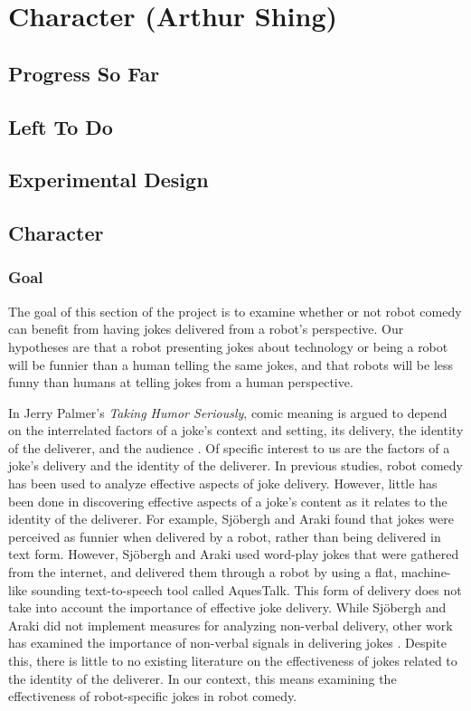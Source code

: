 \documentclass[onecolumn, draftclsnofoot,10pt, compsoc]{IEEEtran}
\begin{document}
\section{Character (Arthur Shing)}
\subsection{Progress So Far}
\subsection{Left To Do}
\subsection{Experimental Design}
\subsection{Character}
\subsubsection{Goal}
The goal of this section of the project is to examine whether or not robot comedy can benefit from having jokes delivered from a robot's perspective. Our hypotheses are that a robot presenting jokes about technology or being a robot will be funnier than a human telling the same jokes, and that robots will be less funny than humans at telling jokes from a human perspective.

In Jerry Palmer's \textit{Taking Humor Seriously}, comic meaning is argued to depend on the interrelated factors of a joke's context and setting, its delivery, the identity of the deliverer, and the audience \cite{Palmer:1993}.
Of specific interest to us are the factors of a joke's delivery and the identity of the deliverer.
In previous studies, robot comedy has been used to analyze effective aspects of joke delivery.
However, little has been done in discovering effective aspects of a joke's content as it relates to the identity of the deliverer.
For example, Sj\"{o}bergh and Araki \cite{RobotsMakeThings:2008} found that jokes were perceived as funnier when delivered by a robot, rather than being delivered in text form.
However, Sj\"{o}bergh and Araki used word-play jokes that were gathered from the internet, and delivered them through a robot by using a flat, machine-like sounding text-to-speech tool called AquesTalk. This form of delivery does not take into account the importance of effective joke delivery. While Sj\"{o}bergh and Araki did not implement measures for analyzing non-verbal delivery, other work has examined the importance of non-verbal signals in delivering jokes \cite{KatevasRobot:2014} \cite{KnightEightLessons:2011}.
Despite this, there is little to no existing literature on the effectiveness of jokes related to the identity of the deliverer.
In our context, this means examining the effectiveness of robot-specific jokes in robot comedy.
\end{document}

